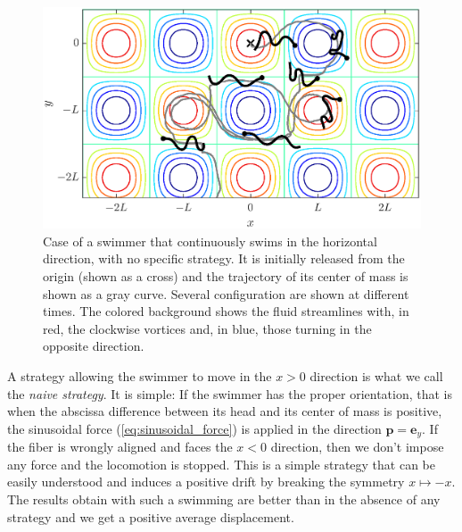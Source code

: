 \documentclass[aps,pre,reprint,superscriptaddress]{revtex4-2}
\begin{document}
\begin{figure}[ht]
  \centerline{\includegraphics[width=\columnwidth]{displ_nostrategy}}
  \caption{\label{fig:displ_nostrategy} Case of a swimmer that continuously swims in the horizontal direction, with no specific strategy. It is initially released from the origin (shown as a cross) and the trajectory of its center of mass is shown as a gray curve. Several configuration are shown at different times. The colored background shows the fluid streamlines with, in red, the clockwise vortices and, in blue, those turning in the opposite direction.}
\end{figure}

A strategy allowing the swimmer to move in the $x>0$ direction is what we call the \textit{naive strategy}. It is simple: If the swimmer has the proper orientation, that is when the abscissa difference between its head and its center of mass is positive, the sinusoidal force (\ref{eq:sinusoidal_force}) is applied in the direction $\bm p = \bm e_y$. If the fiber is wrongly aligned and faces the $x<0$ direction, then we don't impose any force and the locomotion is stopped. This is a simple strategy that can be easily understood and induces a positive drift by breaking the symmetry $x\mapsto-x$. The results obtain with such a swimming are better than in the absence of any strategy and we get a positive average displacement. 
\end{document}
